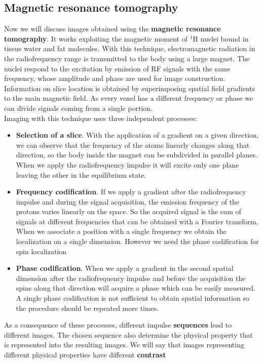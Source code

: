 \subsection{Magnetic resonance tomography}

Now we will discuss images obtained using the \textbf{magnetic resonance tomography}. It works exploiting the magnetic moment of $^{1}$H nuclei bound in tissue water and fat molecules. With this technique, electromagnetic radiation in the radiofrequency range is transmitted to the body using a large magnet. The nuclei respond to the excitation by emission of RF signals with the same frequency, whose amplitude and phase are used for image construction. Information on slice location is obtained by superimposing spatial field gradients to the main magnetic field. As every voxel has a different frequency or phase we can divide signals coming from a single portion.\\

Imaging with this technique uses three independent processes:
\begin{itemize}
 \item \textbf{Selection of a slice}. With the application of a gradient on a given direction, we can observe that the frequency of the atoms linearly changes along that direction, so the body inside the magnet can be subdivided in parallel planes. When we apply the radiofrequency impulse it will excite only one plane leaving the other in the equilibrium state.
 \item \textbf{Frequency codification}. If we apply a gradient after the radiofrequency impulse and during the signal acquisition, the emission frequency of the protons varies linearly on the space. So the acquired signal is the sum of signals at different frequencies that can be obtained with a Fourier transform. When we associate a position with a single frequency we obtain the localization on a single dimension. However we need the phase codification for spin localization
 \item \textbf{Phase codification}. When we apply a gradient in the second spatial dimension after the radiofrequency impulse and before the acquisition the spins along that direction will acquire a phase which can be easily measured. A single phase codification is not sufficient to obtain spatial information so the procedure should be repeated more times.
\end{itemize}

As a consequence of these processes, different impulse \textbf{sequences} lead to different images. The chosen sequence also determine the physical property that is represented into the resulting images. We will say that images representing different physical properties have different \textbf{contrast}

